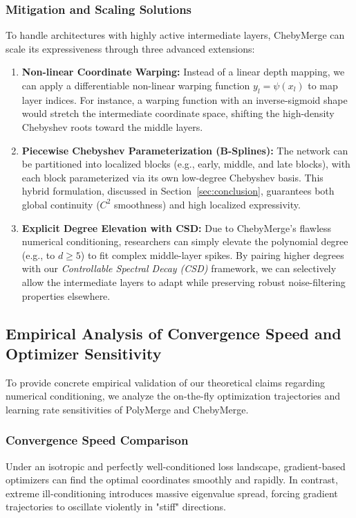 \documentclass{article}
\theoremstyle{plain}
\theoremstyle{definition}
\theoremstyle{remark}
\begin{document}
\subsubsection{Mitigation and Scaling Solutions}
To handle architectures with highly active intermediate layers, ChebyMerge can scale its expressiveness through three advanced extensions:
\begin{enumerate}
    \item \textbf{Non-linear Coordinate Warping:} Instead of a linear depth mapping, we can apply a differentiable non-linear warping function $y_l = \psi(x_l)$ to map layer indices. For instance, a warping function with an inverse-sigmoid shape would stretch the intermediate coordinate space, shifting the high-density Chebyshev roots toward the middle layers.
    \item \textbf{Piecewise Chebyshev Parameterization (B-Splines):} The network can be partitioned into localized blocks (e.g., early, middle, and late blocks), with each block parameterized via its own low-degree Chebyshev basis. This hybrid formulation, discussed in Section~\ref{sec:conclusion}, guarantees both global continuity ($C^2$ smoothness) and high localized expressivity.
    \item \textbf{Explicit Degree Elevation with CSD:} Due to ChebyMerge's flawless numerical conditioning, researchers can simply elevate the polynomial degree (e.g., to $d \ge 5$) to fit complex middle-layer spikes. By pairing higher degrees with our \emph{Controllable Spectral Decay (CSD)} framework, we can selectively allow the intermediate layers to adapt while preserving robust noise-filtering properties elsewhere.
\end{enumerate}

\subsection{Empirical Analysis of Convergence Speed and Optimizer Sensitivity}
To provide concrete empirical validation of our theoretical claims regarding numerical conditioning, we analyze the on-the-fly optimization trajectories and learning rate sensitivities of PolyMerge and ChebyMerge.

\subsubsection{Convergence Speed Comparison}
Under an isotropic and perfectly well-conditioned loss landscape, gradient-based optimizers can find the optimal coordinates smoothly and rapidly. In contrast, extreme ill-conditioning introduces massive eigenvalue spread, forcing gradient trajectories to oscillate violently in "stiff" directions. 
\end{document}
